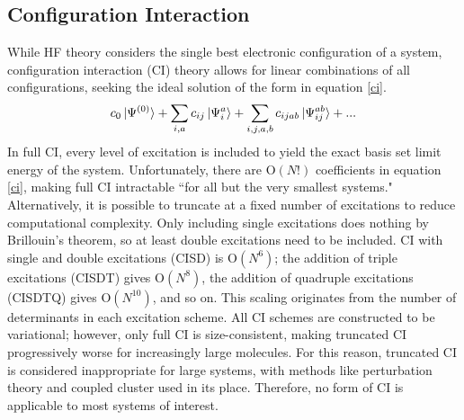 \documentclass{article}
\begin{document}
\subsection{Configuration Interaction}
\begin{paragraph}{}
While HF theory considers the single best electronic configuration of a system, configuration interaction (CI) theory allows for linear combinations of all configurations, seeking the ideal solution of the form in equation \ref{ci}. \cite{szabo}
\begin{equation}\label{ci}
c_{0}\ket{\Psi^{\left(0\right)}}+\sum_{i,a}c_{ij}\ket{\Psi_i^a}+\sum_{i,j,a,b}c_{ijab}\ket{\Psi_{ij}^{ab}}+...
\end{equation}
In full CI, every level of excitation is included to yield the exact basis set limit energy of the system. \cite{szabo} Unfortunately, there are O$\left(N!\right)$ coefficients in equation \ref{ci}, making full CI intractable ``for all but the very smallest systems." \cite{szabo,jensen} Alternatively, it is possible to truncate at a fixed number of excitations to reduce computational complexity. \cite{jensen} Only including single excitations does nothing by Brillouin's theorem, so at least double excitations need to be included. \cite{szabo}  CI with single and double excitations (CISD) is O$\left(N^6\right)$; the addition of triple excitations (CISDT) gives O$\left(N^8\right)$, the addition of quadruple excitations (CISDTQ) gives O$\left(N^{10}\right)$, and so on. \cite{jensen}  This scaling originates from the number of determinants in each excitation scheme. \cite{jensen} All CI schemes are constructed to be variational; however, only full CI is size-consistent, making truncated CI progressively worse for increasingly large molecules. \cite{atkins} For this reason, truncated CI is considered inappropriate for large systems, with methods like perturbation theory and coupled cluster used in its place. \cite{szabo,atkins} Therefore, no form of CI is applicable to most systems of interest.  
\end{paragraph}
\end{document}
